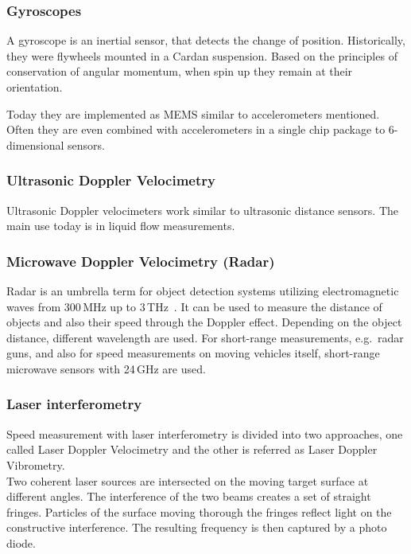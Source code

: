 \documentclass[12pt,a4paper]{article}
\begin{document}
\subsubsection{Gyroscopes}

A gyroscope is an inertial sensor, that detects the change of position.
Historically, they were flywheels mounted in a Cardan suspension. 
Based on the principles of conservation of angular momentum, when spin up they remain at their orientation.

Today they are implemented as MEMS similar to accelerometers mentioned.
Often they are even combined with accelerometers in a single chip package to 6-dimensional sensors.


\subsubsection{Ultrasonic Doppler Velocimetry}

Ultrasonic Doppler velocimeters  work similar to ultrasonic distance sensors.
The main use today is in liquid flow  measurements.


\subsubsection{Microwave Doppler Velocimetry (Radar)}

Radar is an umbrella term for object detection systems utilizing electromagnetic waves from 300\,MHz up to 3\,THz~\cite{nrt}.
It can be used to measure the distance of objects and also their speed through the Doppler effect.
Depending on the object distance, different wavelength are used.
For short-range measurements, e.g.\ radar guns, and also for speed measurements on moving vehicles itself, short-range microwave sensors with 24\,GHz are used.~\cite{s_r_radar}

\subsubsection{Laser interferometry}

Speed measurement with laser interferometry is divided into two approaches, one called Laser Doppler Velocimetry and the other is referred as Laser Doppler Vibrometry.\\
Two coherent laser sources are intersected on the moving target surface at different angles.
The interference of the two beams creates a set of straight fringes. 
Particles of the surface moving thorough the fringes reflect light on the constructive interference.
The resulting frequency is then captured by a photo diode.
\end{document}
